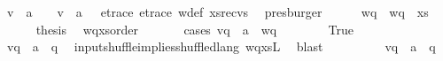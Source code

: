\begin{isabellebody}
\ {\isacartoucheopen}v\ {\isasymsqdot}\ a\ {\isacharhash}{\kern0pt}\ {\isasymepsilon}\ {\isacharequal}{\kern0pt}\ {\isacharparenleft}{\kern0pt}v\ {\isasymsqdot}\ a\ {\isacharhash}{\kern0pt}\ {\isasymepsilon}{\isacharparenright}{\kern0pt}{\isasymdown}\isactrlsub {\isacharbang}{\kern0pt}{\isacartoucheclose}\ e{\isacharunderscore}{\kern0pt}trace\ e{\isacharunderscore}{\kern0pt}trace{}\ w{\isacharunderscore}{\kern0pt}def\ xs{\isacharunderscore}{\kern0pt}recvs\ \isamarkupfalse%
\ presburger\isanewline
\ \ \ \ \isamarkupfalse%
\ {\isacharquery}{\kern0pt}wq\ {\isacharequal}{\kern0pt}\ {\isachardoublequoteopen}wq\ {\isasymsqdot}\ xs{\isachardoublequoteclose}\isanewline
\ \ \ \ \isamarkupfalse%
\ {\isacharquery}{\kern0pt}thesis\ \isamarkupfalse%
\ wqxs{\isacharunderscore}{\kern0pt}order\ \isanewline
\ \ \ \ \isamarkupfalse%
\ {\isacharparenleft}{\kern0pt}cases\ {\isachardoublequoteopen}{\isacharparenleft}{\kern0pt}{\isacharquery}{\kern0pt}v{\isacharprime}{\kern0pt}{\isasymdown}\isactrlsub q\ {\isasymsqdot}\ {\isacharbrackleft}{\kern0pt}a{\isacharbrackright}{\kern0pt}{\isacharparenright}{\kern0pt}\ {\isasymsqunion}{\isasymsqunion}\isactrlsub {\isacharquery}{\kern0pt}\ {\isacharparenleft}{\kern0pt}{\isacharquery}{\kern0pt}wq{\isacharparenright}{\kern0pt}{\isachardoublequoteclose}{\isacharparenright}{\kern0pt}\isanewline
\ \ \ \ \ \ \isamarkupfalse%
\ True\isanewline
\ \ \ \ \ \ \isamarkupfalse%
\ \isamarkupfalse%
\ {\isachardoublequoteopen}{\isacharparenleft}{\kern0pt}{\isacharquery}{\kern0pt}v{\isacharprime}{\kern0pt}{\isasymdown}\isactrlsub q\ {\isasymsqdot}\ {\isacharbrackleft}{\kern0pt}a{\isacharbrackright}{\kern0pt}{\isacharparenright}{\kern0pt}\ {\isasymin}\ {\isacharparenleft}{\kern0pt}{\isasymL}\isactrlsup {\isacharasterisk}{\kern0pt}\isactrlsub {\isasymsqunion}\isactrlsub {\isasymsqunion}{\isacharparenleft}{\kern0pt}q{\isacharparenright}{\kern0pt}{\isacharparenright}{\kern0pt}{\isachardoublequoteclose}\ \isamarkupfalse%
\ input{\isacharunderscore}{\kern0pt}shuffle{\isacharunderscore}{\kern0pt}implies{\isacharunderscore}{\kern0pt}shuffled{\isacharunderscore}{\kern0pt}lang\ wqxs{\isacharunderscore}{\kern0pt}L\ \isamarkupfalse%
\ blast\isanewline
\ \ \ \ \ \ \isamarkupfalse%
\ \isamarkupfalse%
\ {\isachardoublequoteopen}{\isacharparenleft}{\kern0pt}{\isacharquery}{\kern0pt}v{\isacharprime}{\kern0pt}{\isasymdown}\isactrlsub q\ {\isasymsqdot}\ {\isacharbrackleft}{\kern0pt}a{\isacharbrackright}{\kern0pt}{\isacharparenright}{\kern0pt}\ {\isasymin}\ {\isacharparenleft}{\kern0pt}{\isasymL}\isactrlsup {\isacharasterisk}{\kern0pt}{\isacharparenleft}{\kern0pt}q{\isacharparenright}{\kern0pt}{\isacharparenright}{\kern0pt}{\isachardoublequoteclose}\ \isamarkupfalse%

\end{isabellebody}
